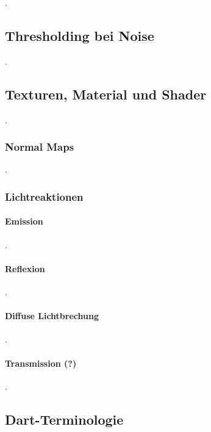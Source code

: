 .

\subsection{Thresholding bei Noise}

.



\subsection{Texturen, Material und Shader}
\label{sec:material_texturen}

.

\subsubsection{Normal Maps}

.

\subsubsection{Lichtreaktionen}

\paragraph{Emission}

.

\paragraph{Reflexion}

.

\paragraph{Diffuse Lichtbrechung}

.

\paragraph{Transmission (?)}

.


\subsection{Dart-Terminologie}
\label{sec:dart_terminologie}

